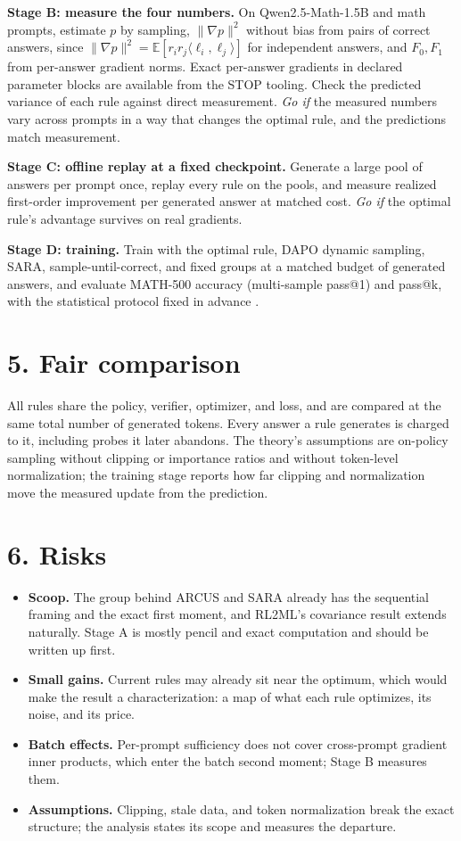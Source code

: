 \documentclass[11pt]{article}
\newcommand{\E}{\mathbb{E}}
\begin{document}
\textbf{Stage B: measure the four numbers.} On Qwen2.5-Math-1.5B and math prompts, estimate $p$ by sampling, $\|\nabla p\|^2$ without bias from pairs of correct answers, since $\|\nabla p\|^2=\E[r_ir_j\langle\ell_i,\ell_j\rangle]$ for independent answers, and $F_0,F_1$ from per-answer gradient norms. Exact per-answer gradients in declared parameter blocks are available from the STOP tooling. Check the predicted variance of each rule against direct measurement. \emph{Go if} the measured numbers vary across prompts in a way that changes the optimal rule, and the predictions match measurement.

\textbf{Stage C: offline replay at a fixed checkpoint.} Generate a large pool of answers per prompt once, replay every rule on the pools, and measure realized first-order improvement per generated answer at matched cost. \emph{Go if} the optimal rule's advantage survives on real gradients.

\textbf{Stage D: training.} Train with the optimal rule, DAPO dynamic sampling, SARA, sample-until-correct, and fixed groups at a matched budget of generated answers, and evaluate MATH-500 accuracy (multi-sample pass@1) and pass@k, with the statistical protocol fixed in advance \citep{shao2024deepseekmath}.

\section{5. Fair comparison}
All rules share the policy, verifier, optimizer, and loss, and are compared at the same total number of generated tokens. Every answer a rule generates is charged to it, including probes it later abandons. The theory's assumptions are on-policy sampling without clipping or importance ratios and without token-level normalization; the training stage reports how far clipping and normalization move the measured update from the prediction.

\section{6. Risks}
\begin{itemize}[leftmargin=*,itemsep=2pt,topsep=2pt]
\item \textbf{Scoop.} The group behind ARCUS and SARA already has the sequential framing and the exact first moment, and RL2ML's covariance result extends naturally. Stage A is mostly pencil and exact computation and should be written up first.
\item \textbf{Small gains.} Current rules may already sit near the optimum, which would make the result a characterization: a map of what each rule optimizes, its noise, and its price.
\item \textbf{Batch effects.} Per-prompt sufficiency does not cover cross-prompt gradient inner products, which enter the batch second moment; Stage B measures them.
\item \textbf{Assumptions.} Clipping, stale data, and token normalization break the exact structure; the analysis states its scope and measures the departure.
\end{itemize}
\end{document}
